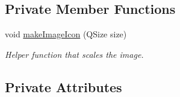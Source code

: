 \subsection*{Private Member Functions}
\begin{DoxyCompactItemize}
\item 
void \hyperlink{class_u_i_1_1_image_item_widget_a55a907134258834f56673835595e4a4e}{make\-Image\-Icon} (Q\-Size size)
\begin{DoxyCompactList}\small\item\em Helper function that scales the image. \end{DoxyCompactList}\end{DoxyCompactItemize}
\subsection*{Private Attributes}
